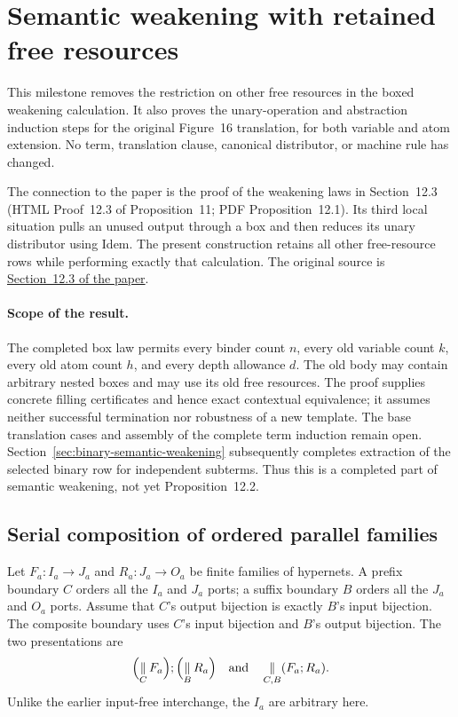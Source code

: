 \clearpage
\section{Semantic weakening with retained free resources}
\label{sec:resource-semantic-weakening}
This milestone removes the restriction on other free resources in the boxed
weakening calculation. It also proves the unary-operation and abstraction
induction steps for the original Figure~16 translation, for both variable
and atom extension. No term, translation clause, canonical distributor,
or machine rule has changed.

The connection to the paper is the proof of the weakening laws in
Section~12.3 (HTML Proof~12.3 of Proposition~11; PDF Proposition~12.1).
Its third local situation pulls an unused output through a box and then
reduces its unary distributor using Idem. The present construction retains
all other free-resource rows while performing exactly that calculation.
The original source is
\href{https://arxiv.org/html/1907.01257v5\#S12.SS3}{Section~12.3 of the paper}.

\paragraph{Scope of the result.}
The completed box law permits every binder count $n$, every old variable
count $k$, every old atom count $h$, and every depth allowance $d$.
The old body may contain arbitrary nested boxes and may use its old free
resources. The proof supplies concrete filling certificates and hence exact
contextual equivalence; it assumes neither successful termination nor
robustness of a new template. The base translation cases and assembly of the complete term induction
remain open. Section~\ref{sec:binary-semantic-weakening} subsequently
completes extraction of the selected binary row for independent subterms. Thus this is a completed part of
semantic weakening, not yet Proposition~12.2.

\subsection{Serial composition of ordered parallel families}
Let $F_a:I_a\to J_a$ and $R_a:J_a\to O_a$ be finite families of hypernets.
A prefix boundary $C$ orders all the $I_a$ and $J_a$ ports; a suffix boundary
$B$ orders all the $J_a$ and $O_a$ ports. Assume that $C$'s output bijection
is exactly $B$'s input bijection. The composite boundary uses $C$'s input
bijection and $B$'s output bijection. The two presentations are
\[
 \Bigl(\mathop{\parallel}_C F_a\Bigr);
 \Bigl(\mathop{\parallel}_B R_a\Bigr)
 \quad\hbox{and}\quad
 \mathop{\parallel}_{C,B}(F_a;R_a).
\]
Unlike the earlier input-free interchange, the $I_a$ are arbitrary here.

